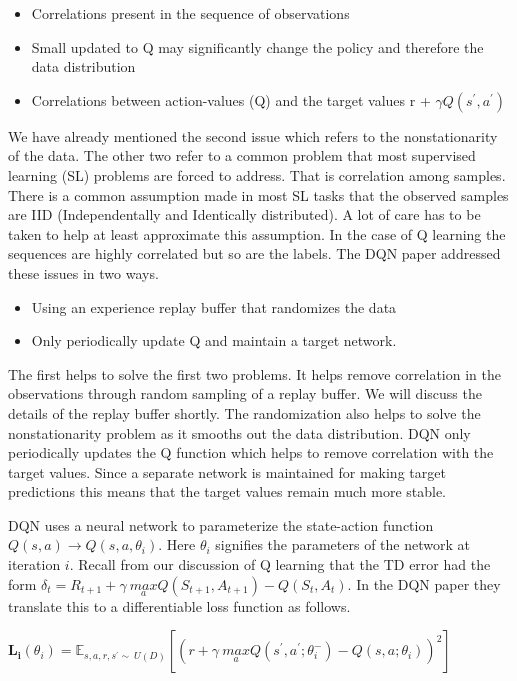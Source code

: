 \begin{itemize}
    \item Correlations present in the sequence of observations
    \item Small updated to Q may significantly change the policy and therefore the data distribution
    \item Correlations between action-values (Q) and the target values r + $\gamma Q(s^{'},a^{'})$
\end{itemize}

We have already mentioned the second issue which refers to the nonstationarity of the data. The other two refer to a common problem that most supervised learning (SL) problems are forced to address. That is correlation among samples. There is a common assumption made in most SL tasks that the observed samples are IID (Independentally and Identically distributed). A lot of care has to be taken to help at least approximate this assumption.  In the case of Q learning the sequences are highly correlated but so are the labels. The DQN paper addressed these issues in two ways. 

\begin{itemize}
    \item Using an experience replay buffer that randomizes the data
    \item Only periodically update Q and maintain a target network. 
\end{itemize}

The first helps to solve the first two problems. It helps remove correlation in the observations through random sampling of a replay buffer. We will discuss the details of the replay buffer shortly. The randomization also helps to solve the nonstationarity problem as it smooths out the data distribution. DQN only periodically updates the Q function which helps to remove correlation with the target values. Since a separate network is maintained for making target predictions this means that the target values remain much more stable. 

DQN uses a neural network to parameterize the state-action function $Q(s,a) \rightarrow Q(s,a,\theta_{i})$. Here $\theta_{i}$ signifies the parameters of the network at iteration $i$. Recall from our discussion of Q learning that the TD error had the form $\delta_{t} = R_{t + 1} + \gamma \: \underset{a}{max} Q(S_{t + 1},A_{t + 1}) - Q(S_{t},A_{t})$. In the DQN paper they translate this to a differentiable loss function as follows. 

$ \mathbf{L_{i}}(\theta_{i}) = \mathbb{E}_{s,a,r,s^{'} \sim \: U(D)} [(r + \gamma \: \underset{a}{max} Q(s^{'},a^{'};\theta_{i}^{-}) - Q(s,a;\theta_{i}))^{2}]$


